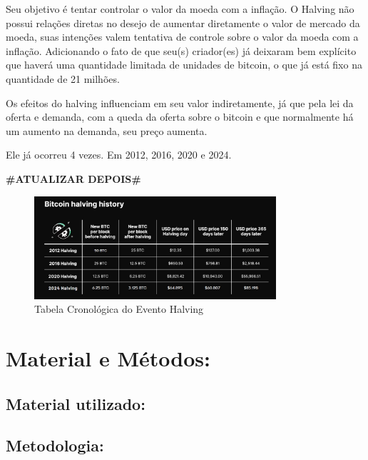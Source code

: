 \documentclass[12pt]{article}
\begin{document}
Seu objetivo é tentar controlar o valor da moeda com a inflação. O Halving não possui relações diretas no desejo de aumentar diretamente o valor de mercado da moeda, suas intenções valem tentativa de controle sobre o valor da moeda com a inflação. Adicionando o fato de que seu(s) criador(es) já deixaram bem explícito que haverá uma quantidade limitada de unidades de bitcoin, o que já está fixo na quantidade de 21 milhões.

Os efeitos do halving influenciam em seu valor indiretamente, já que pela lei da oferta e demanda, com a queda da oferta sobre o bitcoin e que normalmente há um aumento na demanda, seu preço aumenta.

Ele já ocorreu 4 vezes. Em 2012, 2016, 2020 e 2024.

\textbf{\#ATUALIZAR DEPOIS\#}

\begin{figure}[h]
    \centering
    \includegraphics[width=0.8\textwidth]{Imagens/Bitcoin-halving-history.jpg}
    \caption{Tabela Cronológica do Evento Halving}
    \label{fig:Tabela Cronologica do Evento Halving}
\end{figure}

\newpage

\section*{Material e Métodos:}

\subsection*{Material utilizado:}

\subsection*{Metodologia:}
\end{document}
